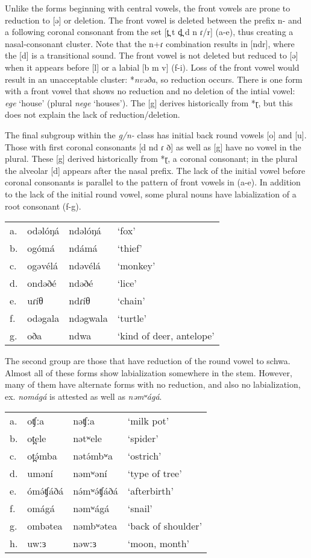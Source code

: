 Unlike the forms beginning with central vowels, the front vowels are prone to reduction to [ə] or deletion. The front vowel is deleted between the prefix n- and a following coronal consonant from the set [t̪ t d̪ d n ɾ/r] (a-e), thus creating a nasal-consonant cluster. Note that the n+ɾ combination results in [ndr], where the [d] is a transitional sound. The front vowel is not deleted but reduced to [ə] when it appears before [l] or a labial [b m v] (f-i). Loss of the front vowel would result in an unacceptable cluster: *\textit{nvəða}, so reduction occurs. There is one form with a front vowel that shows no reduction and no deletion of the intial vowel: \textit{ege} ‘house’ (plural \textit{nege} ‘houses’). The [g] derives historically from *ɽ, but this does not explain the lack of reduction/deletion. 
	
The final subgroup within the \textit{g/n-} class has initial back round vowels [o] and [u]. Those with first coronal consonants [d nd ɾ ð] as well as [g] have no vowel in the plural. These [g] derived historically from *ɽ, a coronal consonant; in the plural the alveolar [d] appears after the nasal prefix. The lack of the initial vowel before coronal consonants is parallel to the pattern of front vowels in (a-e). In addition to the lack of the initial round vowel, some plural nouns have labialization of a root consonant (f-g).

\ea
\begin{tabular}[t]{llll}
a.	&	odəlóŋá	&	ndəlóŋá		&	‘fox’\\
b.	&	ogómá	&	ndámá		&	‘thief’\\
c.	&	ogəvélá	&	ndəvélá		&	‘monkey’\\
d.	&	ondəðé	&	ndəðé		&	‘lice’\\
e.	&	uɾíθ	&	ndɾíθ		&	‘chain’\\
f.	&	odəgala	&	ndəgwala		&	‘turtle’\\
g.	&	oða		&	ndwa			&	‘kind of deer, antelope’	\\
\end{tabular}
\z

The second group are those that have reduction of the round vowel to schwa. Almost all of these forms show labialization somewhere in the stem. However, many of them have alternate forms with no reduction, and also no labialization, ex. \textit{nomágá} is attested as well as \textit{nəmʷágá}. 

\ea	
\begin{tabular}[t]{llll}
a.	&	oʧːa	&	nəʧːa	&	‘milk pot’\\
b.	&	ot̪ele	&	nətʷele	&	‘spider’\\
c.	&	ot̪ə́mba	&	nətə́mbʷa	&	‘ostrich’\\
d.	&	uməní	&	nəmʷəní	&	‘type of tree’\\
e.	&	ómə́ʧáðá	&	nə́mʷə́ʧáðá	&	‘afterbirth’\\
f.	&	omágá	&	nəmʷágá	&	‘snail’\\
g.	&	ombətea	&	nəmbʷətea&	‘back of shoulder’\\
h.	&	uwːɜ	&	nəwːɜ	&	‘moon, month’\\
\end{tabular}
\z


